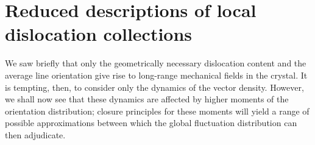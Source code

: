 \section{Reduced descriptions of local dislocation
collections\label{sec:3_reduced_descriptions}}

We saw briefly that only the geometrically necessary dislocation content and the average line orientation give rise to long-range mechanical fields in the crystal. It is tempting, then, to consider only the dynamics of the vector density. However, we shall now see that these dynamics are affected by higher moments of the orientation distribution; closure principles for these moments will yield a range of possible approximations between which the global fluctuation distribution can then adjudicate.

